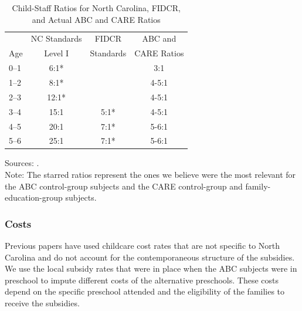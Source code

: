 \begin{table}[H]
\centering
\caption{Child-Staff Ratios for North Carolina, FIDCR, and Actual ABC and CARE Ratios}
\label{table:staff}
\begin{threeparttable}
\begin{tabular}{lccc}
\toprule
 &NC Standards & FIDCR &  ABC and   \\
Age	& Level I &  Standards  & CARE Ratios\\ \midrule
0--1	& 6:1*	&  				& 	3:1					\\
1--2	& 8:1* 	& 				&   4-5:1				\\
2--3	& 12:1* & 				& 	4-5:1				\\
3--4	& 15:1 	& 		5:1*	& 	4-5:1 				\\
4--5	& 20:1 	& 		7:1*	& 	5-6:1 				\\
5--6 & 25:1  &		7:1*	&	5-6:1				\\
\bottomrule
\end{tabular}
\begin{tablenotes}
\footnotesize
Sources: \cite{Department-of-Health_1968_DayCareRequirements,NCGA_1971_House-Bill-100,Ramey-et-al_1977_Intro-to-ABC,Ramey_Campbell_1979_SR,Ramey_McGinness_etal_1982_Abecedarianapproach, Burchinal_Campbell_etal_1997_CD}.\\
Note: The starred ratios represent the ones we believe were the most relevant for the ABC control-group subjects and the CARE control-group and family-education-group subjects.
\end{tablenotes}
\end{threeparttable}
\end{table}

\subsubsection{Costs}
\noindent Previous papers have used childcare cost rates that are not specific to North Carolina and do not account for the contemporaneous structure of the subsidies. We use the local subsidy rates that were in place when the ABC subjects were in preschool to impute different costs of the alternative preschools. These costs depend on the specific preschool attended and the eligibility of the families to receive the subsidies. \\

